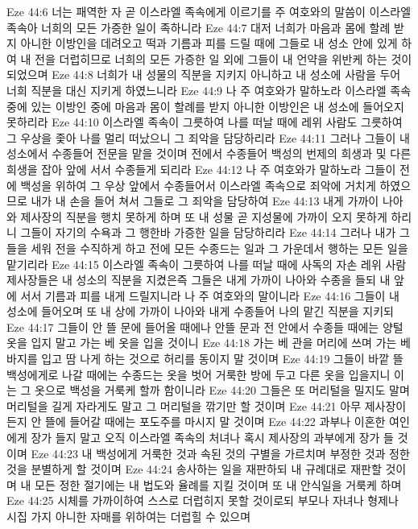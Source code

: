Eze 44:6  너는 패역한 자 곧 이스라엘 족속에게 이르기를 주 여호와의 말씀이 이스라엘 족속아 너희의 모든 가증한 일이 족하니라
Eze 44:7  대저 너희가 마음과 몸에 할례 받지 아니한 이방인을 데려오고 떡과 기름과 피를 드릴 때에 그들로 내 성소 안에 있게 하여 내 전을 더럽히므로 너희의 모든 가증한 일 외에 그들이 내 언약을 위반케 하는 것이 되었으며
Eze 44:8  너희가 내 성물의 직분을 지키지 아니하고 내 성소에 사람을 두어 너희 직분을 대신 지키게 하였느니라
Eze 44:9  나 주 여호와가 말하노라 이스라엘 족속 중에 있는 이방인 중에 마음과 몸이 할례를 받지 아니한 이방인은 내 성소에 들어오지 못하리라
Eze 44:10  이스라엘 족속이 그릇하여 나를 떠날 때에 레위 사람도 그릇하여 그 우상을 좇아 나를 멀리 떠났으니 그 죄악을 담당하리라
Eze 44:11  그러나 그들이 내 성소에서 수종들어 전문을 맡을 것이며 전에서 수종들어 백성의 번제의 희생과 및 다른 희생을 잡아 앞에 서서 수종들게 되리라
Eze 44:12  나 주 여호와가 말하노라 그들이 전에 백성을 위하여 그 우상 앞에서 수종들어서 이스라엘 족속으로 죄악에 거치게 하였으므로 내가 내 손을 들어 쳐서 그들로 그 죄악을 담당하여
Eze 44:13  내게 가까이 나아와 제사장의 직분을 행치 못하게 하며 또 내 성물 곧 지성물에 가까이 오지 못하게 하리니 그들이 자기의 수욕과 그 행한바 가증한 일을 담당하리라
Eze 44:14  그러나 내가 그들을 세워 전을 수직하게 하고 전에 모든 수종드는 일과 그 가운데서 행하는 모든 일을 맡기리라
Eze 44:15  이스라엘 족속이 그릇하여 나를 떠날 때에 사독의 자손 레위 사람 제사장들은 내 성소의 직분을 지켰은즉 그들은 내게 가까이 나아와 수종을 들되 내 앞에 서서 기름과 피를 내게 드릴지니라 나 주 여호와의 말이니라
Eze 44:16  그들이 내 성소에 들어오며 또 내 상에 가까이 나아와 내게 수종들어 나의 맡긴 직분을 지키되
Eze 44:17  그들이 안 뜰 문에 들어올 때에나 안뜰 문과 전 안에서 수종들 때에는 양털 옷을 입지 말고 가는 베 옷을 입을 것이니
Eze 44:18  가는 베 관을 머리에 쓰며 가는 베 바지를 입고 땀 나게 하는 것으로 허리를 동이지 말 것이며
Eze 44:19  그들이 바깥 뜰 백성에게로 나갈 때에는 수종드는 옷을 벗어 거룩한 방에 두고 다른 옷을 입을지니 이는 그 옷으로 백성을 거룩케 할까 함이니라
Eze 44:20  그들은 또 머리털을 밀지도 말며 머리털을 길게 자라게도 말고 그 머리털을 깎기만 할 것이며
Eze 44:21  아무 제사장이든지 안 뜰에 들어갈 때에는 포도주를 마시지 말 것이며
Eze 44:22  과부나 이혼한 여인에게 장가 들지 말고 오직 이스라엘 족속의 처녀나 혹시 제사장의 과부에게 장가 들 것이며
Eze 44:23  내 백성에게 거룩한 것과 속된 것의 구별을 가르치며 부정한 것과 정한 것을 분별하게 할 것이며
Eze 44:24  송사하는 일을 재판하되 내 규례대로 재판할 것이며 내 모든 정한 절기에는 내 법도와 율례를 지킬 것이며 또 내 안식일을 거룩케 하며
Eze 44:25  시체를 가까이하여 스스로 더럽히지 못할 것이로되 부모나 자녀나 형제나 시집 가지 아니한 자매를 위하여는 더럽힐 수 있으며
